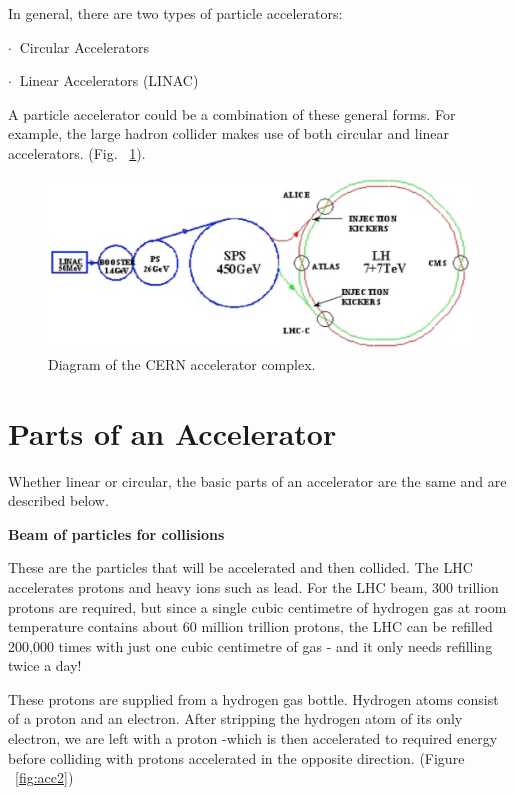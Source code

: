 \;
\noindent
In general, there are two types of particle accelerators: 

\;
\noindent
          $ \cdot \:$  Circular Accelerators 

 \noindent 
 $ \cdot \:$  Linear Accelerators (LINAC)

\;
A particle accelerator could be a combination of these general forms. For example, the large hadron collider  makes use of both circular and linear accelerators. (Fig. ~\ref{fig:acc1}).

\;
\;

\begin{figure}[h]
\centering\includegraphics[scale=0.5]{./Particleaccelerators/Pictures/fig1.pdf}
\caption{Diagram of the CERN accelerator complex.}
\label{fig:acc1}
\end{figure}

\section{Parts of an Accelerator}

Whether linear or circular, the basic parts of an accelerator are the same and are described below.

\;
\;
\;

\noindent
\textbf{Beam of particles for collisions}

\;
\;

\noindent
These are the particles that will be accelerated and then collided. The LHC accelerates protons and heavy ions such as lead. For the LHC beam, 300 trillion protons are required, but since a single cubic centimetre of hydrogen gas at room temperature contains about 60 million trillion protons, the LHC can be refilled 200,000 times with just one cubic centimetre of gas - and it only needs refilling twice a day!

\;
\noindent
These protons are supplied from a hydrogen gas bottle. Hydrogen atoms consist of a proton and an electron. After stripping the hydrogen atom of its only electron, we are left with a proton -which is then accelerated to required energy before colliding with protons accelerated in the opposite direction. (Figure ~\ref{fig:acc2})

